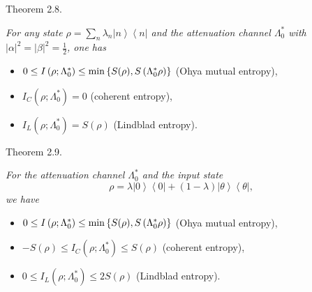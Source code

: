 \smallskip

{\small\sc Theorem 2.8.}
{\it 
For any state  $  \rho =\sum_{n}{\lambda _{n}}\left\vert n\right\rangle
\left\langle n\right\vert  $   and the attenuation channel  $  \Lambda _{0}^{\ast
}  $   with  $  \left\vert \alpha \right\vert ^{2}=\left\vert \beta \right\vert
^{2}=\frac{1}{2} $,   one has

\begin{itemize}

\item[$  (1) $]    $  0\leq I\left( {\rho ;\Lambda _{0}^{\ast }}\right) \leq \min \left\{ {%
S( \rho), S\left( {\Lambda _{0}^{\ast }\rho }\right) }\right\}  $  %
(Ohya mutual entropy),

\item[$  (2) $]    $  I_{C}\left( {\rho ;\Lambda _{0}^{\ast }}\right) =0 $   (coherent
entropy),

\item[$  (3) $]   $  I_{L}\left( {\rho ;\Lambda _{0}^{\ast }}\right) =S( \rho) 
 $   (Lindblad entropy).

\end{itemize} 
 
}
\smallskip

{\small\sc Theorem 2.9.}
{\it 
For the attenuation channel  $  \Lambda _{0}^{\ast } $   and the input state  $$  \rho
=\lambda \left\vert 0\right\rangle \left\langle 0\right\vert +(1-\lambda
)\left\vert \theta \right\rangle \left\langle \theta \right\vert  ,$$   we have
\begin{itemize}
\item[$  (1) $]    $  0\leq I\left( {\rho ;\Lambda _{0}^{\ast }}\right) \leq \min \left\{ {%
S( \rho), S\left( {\Lambda _{0}^{\ast }\rho }\right) }\right\}  $  %
(Ohya mutual entropy),

\item[$  (2) $]    $-S( \rho) \leq I_{C}\left( {\rho ;\Lambda _{0}^{\ast }}%
\right) \leq S( \rho)  $   (coherent entropy),

\item[$  (3) $]    $  0\leq I_{L}\left( {\rho ;\Lambda _{0}^{\ast }}\right) \leq 2S\left(
\rho \right)  $   (Lindblad entropy).

\end{itemize}
}

\smallskip


